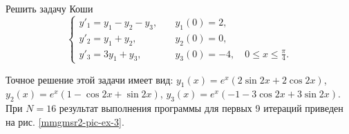\begin{example}\label{mmgmsr2-ex-3}
	Решить задачу Коши
	\begin{equation*}
	\begin{cases}
	y'_1 = y_1 - y_2 - y_3, &\quad y_1(0) = 2,\\
	y'_2 = y_1 + y_2, &\quad y_2(0) = 0,\\
	y'_3 = 3y_1 + y_3, &\quad y_3(0) = -4, \quad 0 \le x \le \frac{\pi}{4}.
	\end{cases}
	\end{equation*}
\end{example}
Точное решение этой задачи имеет вид: $y_1(x)= e^x (2\sin 2x + 2\cos 2x)$, $y_2(x)=e^x (1 - \cos 2x + \sin 2x)$, $y_3 (x) = e^x (-1 - 3\cos 2x + 3\sin 2x)$.
При $N=16$ результат выполнения программы для первых 9 итераций приведен на рис. \ref{mmgmsr2-pic-ex-3}.

